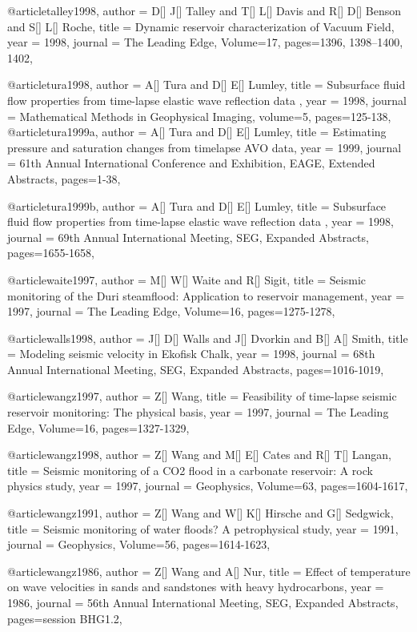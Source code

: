 @article{talley1998,
  author =	 {D[] J[] Talley and T[] L[] Davis and R[] D[] Benson and S[] L[] Roche},
  title =	 {Dynamic reservoir characterization of Vacuum Field},
  year =	 1998,
  journal =	 {The Leading Edge},
    Volume=17,
 pages=1396, 1398–1400, 1402,
}

@article{tura1998,
  author =	 {A[] Tura and D[] E[] Lumley},
  title =	 { Subsurface fluid flow properties from time-lapse elastic wave reflection data },
  year =	 1998,
  journal =	 {Mathematical Methods in Geophysical Imaging},
  volume=5,
 pages=125-138,
}
@article{tura1999a,
  author =	 {A[] Tura and D[] E[] Lumley},
  title =	 {Estimating pressure and saturation changes from timelapse AVO data},
  year =	 1999,
  journal =	 {61th Annual International Conference and Exhibition, EAGE, Extended Abstracts},
 pages=1-38,
}

@article{tura1999b,
  author =	 {A[] Tura and D[] E[] Lumley},
  title =	 { Subsurface fluid flow properties from time-lapse elastic wave reflection data },
  year =	 1998,
 journal =	 {69th Annual International Meeting, SEG, Expanded Abstracts},
 pages=1655-1658,
}

@article{waite1997,
  author =	 {M[] W[] Waite and R[] Sigit},
  title =	 {Seismic monitoring of the Duri steamflood: Application to reservoir management},
  year =	 1997,
  journal =	 {The Leading Edge},
    Volume=16,
 pages=1275-1278,
}

@article{walls1998,
  author =	 {J[] D[] Walls and J[] Dvorkin and B[] A[] Smith},
  title =	 {Modeling seismic velocity in Ekofisk Chalk},
  year =	 1998,
 journal =	 {68th Annual International Meeting, SEG, Expanded Abstracts},
 pages=1016-1019,
}

@article{wangz1997,
  author =	 {Z[] Wang},
  title =	 {Feasibility of time-lapse seismic reservoir monitoring:
The physical basis},
  year =	 1997,
  journal =	 {The Leading Edge},
    Volume=16,
 pages=1327-1329,
}

@article{wangz1998,
  author =	 {Z[] Wang and M[] E[] Cates and R[] T[] Langan},
  title =	 {Seismic monitoring of a CO2 flood in a carbonate reservoir: A rock physics study},
  year =	 1997,
  journal =	 {Geophysics},
    Volume=63,
 pages=1604-1617,
}

@article{wangz1991,
  author =	 {Z[] Wang and W[] K[] Hirsche and G[] Sedgwick},
  title =	 {Seismic monitoring of water floods? A petrophysical study},
  year =	 1991,
  journal =	 {Geophysics},
    Volume=56,
 pages=1614-1623,
}

@article{wangz1986,
  author =	 {Z[] Wang and A[] Nur},
  title =	 {Effect of temperature on wave velocities in
sands and sandstones with heavy hydrocarbons},
  year =	 1986,
 journal =	 {56th Annual International Meeting, SEG, Expanded Abstracts},
 pages=session BHG1.2,
}


